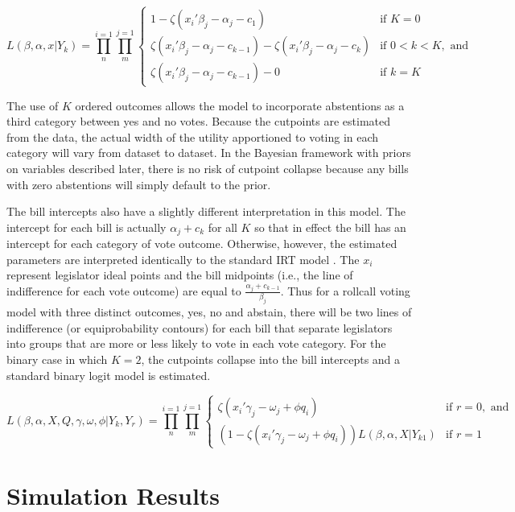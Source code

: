 					\[
	L(\beta,\alpha,x|Y_{k}) = \prod_{n}^{i=1} \prod_{m}^{j=1}
	\begin{cases} 
	1 -  \zeta(x_{i}'\beta_j - \alpha_j - c_1) & \text{if } K = 0 \\
	\zeta(x_{i}'\beta_j - \alpha_j - c_{k-1}) - \zeta(x_{i}'\beta_j - \alpha_j - c_{k})       & \text{if } 0 < k < K, \text{ and} \\
	\zeta(x_{i}'\beta_j - \alpha_j - c_{k-1}) - 0 & \text{if } k=K
	\end{cases}
	\]
	
	The use of $K$ ordered outcomes allows the model to incorporate abstentions as a third category between yes and no votes. Because the cutpoints are estimated from the data, the actual width of the utility apportioned to voting in each category will vary from dataset to dataset. In the Bayesian framework with priors on variables described later, there is no risk of cutpoint collapse because any bills with zero abstentions will simply default to the prior.
	
	The bill intercepts also have a slightly different interpretation in this model. The intercept for each bill is actually $\alpha_j + c_k$ for all $K$ so that in effect the bill has an intercept for each category of vote outcome. Otherwise, however, the estimated parameters are interpreted identically to the standard IRT model \parencite{jackman2004}. The $x_i$ represent legislator ideal points and the bill midpoints (i.e., the line of indifference for each vote outcome) are equal to $\frac{\alpha_j + c_{k-1}}{\beta_j}$. Thus for a rollcall voting model with three distinct outcomes, yes, no and abstain, there will be two lines of indifference (or equiprobability contours) for each bill that separate legislators into groups that are more or less likely to vote in each vote category. For the binary case in which $K=2$, the cutpoints collapse into the bill intercepts and a standard binary logit model is estimated.
	
		 \[
	L(\beta,\alpha,X,Q,\gamma,\omega,\phi|Y_{k},Y_{r}) = 
	\prod_{n}^{i=1} \prod_{m}^{j=1}
	\begin{cases}
	\zeta({x_{i}'\gamma_j - \omega_j + \phi q_i}) & \text{if } r=0, \text{ and} \\
	(1-\zeta({x_{i}'\gamma_j - \omega_j + \phi q_i}))L(\beta,\alpha,X|Y_{k1}) & \text{if } r=1
	\end{cases}
	\]
	
	\section*{Simulation Results}
	
